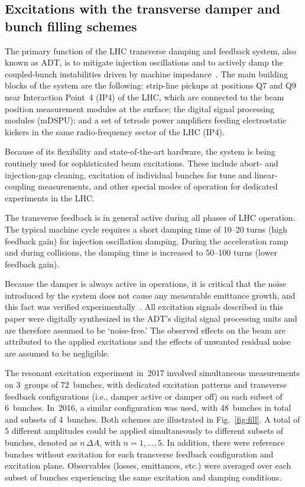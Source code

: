 \documentclass[
prstab
,reprint
,linenumbers
,longbibliography
,preprintnumbers
,showkeys
,amsfonts,amssymb,amsmath
,floatfix
]{revtex4-1}
\begin{document}
\subsection{Excitations with the transverse damper and bunch filling schemes}
\label{sec:adt}

The primary function of the LHC transverse damping and feedback
system, also known as ADT, is to mitigate injection oscillations and
to actively damp the coupled-bunch instabilities driven by machine
impedance~\cite{adt_sum_2008, adt_sum_2011}. The main building blocks
of the system are the following: strip-line pickups at positions Q7
and Q9 near Interaction Point~4 (IP4) of the LHC, which are connected
to the beam position measurement modules at the surface; the digital
signal processing modules (mDSPU); and a set of tetrode power
amplifiers feeding electrostatic kickers in the same radio-frequency
sector of the LHC (IP4).

Because of its flexibility and state-of-the-art hardware, the system
is being routinely used for sophisticated beam excitations. These
include abort- and injection-gap cleaning, excitation of individual
bunches for tune and linear-coupling measurements, and other special
modes of operation for dedicated experiments in the LHC.

The transverse feedback is in general active during all phases of LHC
operation. The typical machine cycle requires a short damping time of
10--20 turns (high feedback gain) for injection oscillation
damping. During the acceleration ramp and during collisions, the
damping time is increased to 50--100 turns (lower feedback gain).

Because the damper is always active in operations, it is critical that
the noise introduced by the system does not cause any measurable
emittance growth, and this fact was verified
experimentally~\cite{adt_noise_emit_2017}. All excitation signals
described in this paper were digitally synthesized in the ADT's
digital signal processing units and are therefore assumed to be
`noise-free.' The observed effects on the beam are attributed to the
applied excitations and the effects of unwanted residual noise are
assumed to be negligible.

The resonant excitation experiment in~2017 involved simultaneous
measurements on 3~groups of 72~bunches, with dedicated excitation
patterns and transverse feedback configurations (i.e., damper active
or damper off) on each subset of 6~bunches. In~2016, a similar
configuration was used, with 48~bunches in total and subsets of
4~bunches. Both schemes are illustrated in Fig.~\ref{fig:fill}. A
total of 5 different amplitudes could be applied simultaneously to
different subsets of bunches, denoted as $n \, \Delta A$, with
$n = 1, \ldots, 5$. In addition, there were reference bunches without
excitation for each transverse feedback configuration and excitation
plane. Observables (losses, emittances, etc.) were averaged over each
subset of bunches experiencing the same excitation and damping
conditions.
\end{document}
